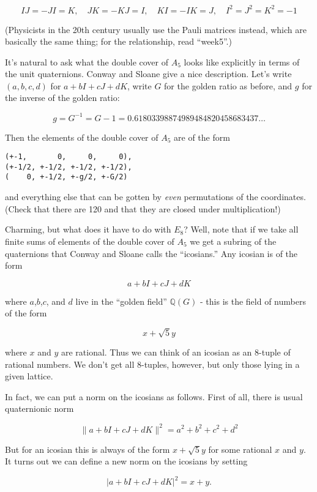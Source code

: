 \documentclass{article}
\begin{document}
\[IJ = -JI = K, \quad JK = -KJ = I, \quad KI = -IK = J, \quad I^2 = J^2 = K^2 = -1\]

(Physicists in the 20th century usually use the Pauli matrices instead,
which are basically the same thing; for the relationship, read
``week5''.)

It's natural to ask what the double cover of \(A_5\) looks like
explicitly in terms of the unit quaternions. Conway and Sloane give a
nice description. Let's write \((a,b,c,d)\) for \(a + bI + cJ + dK\),
write \(G\) for the golden ratio as before, and \(g\) for the inverse of
the golden ratio:

\[g = G^{-1} = G - 1 = 0.61803398874989484820458683437\ldots\]

Then the elements of the double cover of \(A_5\) are of the form

\begin{verbatim}
(+-1,       0,     0,     0),
(+-1/2, +-1/2, +-1/2, +-1/2),
(    0, +-1/2, +-g/2, +-G/2)
\end{verbatim}

and everything else that can be gotten by \emph{even} permutations of
the coordinates. (Check that there are 120 and that they are closed
under multiplication!)

Charming, but what does it have to do with \(E_8\)? Well, note that if
we take all finite sums of elements of the double cover of \(A_5\) we
get a subring of the quaternions that Conway and Sloane calls the
``icosians.'' Any icosian is of the form

\[a + bI + cJ + dK\]

where \(a\),\(b\),\(c\), and \(d\) live in the ``golden field''
\(\mathbb{Q}(G)\) - this is the field of numbers of the form

\[x + \sqrt{5} y\]

where \(x\) and \(y\) are rational. Thus we can think of an icosian as
an 8-tuple of rational numbers. We don't get all 8-tuples, however, but
only those lying in a given lattice.

In fact, we can put a norm on the icosians as follows. First of all,
there is usual quaternionic norm

\[\|a + bI + cJ + dK\|^2 = a^2 + b^2 + c^2 + d^2\]

But for an icosian this is always of the form \(x + \sqrt{5} y\) for
some rational \(x\) and \(y\). It turns out we can define a new norm on
the icosians by setting

\[|a + bI + cJ + dK|^2 = x + y.\]
\end{document}
